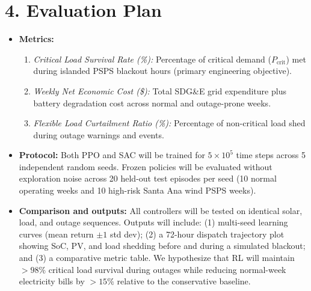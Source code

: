 \documentclass[11pt,letterpaper]{article}
\begin{document}
\section*{4. Evaluation Plan}
\begin{itemize}
  \item \textbf{Metrics:}
  \begin{enumerate}
    \item \emph{Critical Load Survival Rate (\%):} Percentage of critical demand ($P_{\text{crit}}$) met during islanded PSPS blackout hours (primary engineering objective).
    \item \emph{Weekly Net Economic Cost (\$):} Total SDG\&E grid expenditure plus battery degradation cost across normal and outage-prone weeks.
    \item \emph{Flexible Load Curtailment Ratio (\%):} Percentage of non-critical load shed during outage warnings and events.
  \end{enumerate}
  \item \textbf{Protocol:} Both PPO and SAC will be trained for $5 \times 10^5$ time steps across 5 independent random seeds. Frozen policies will be evaluated without exploration noise across 20 held-out test episodes per seed (10 normal operating weeks and 10 high-risk Santa Ana wind PSPS weeks).
  \item \textbf{Comparison and outputs:} All controllers will be tested on identical solar, load, and outage sequences. Outputs will include: (1) multi-seed learning curves (mean return $\pm 1$ std dev); (2) a 72-hour dispatch trajectory plot showing SoC, PV, and load shedding before and during a simulated blackout; and (3) a comparative metric table. We hypothesize that RL will maintain $>98\%$ critical load survival during outages while reducing normal-week electricity bills by $>15\%$ relative to the conservative baseline.
\end{itemize}
\end{document}
